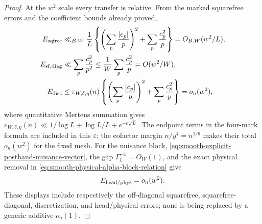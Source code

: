 \documentclass[11pt]{article}
\numberwithin{equation}{section}
\theoremstyle{definition}
\theoremstyle{remark}
\newcommand{\1}{\mathbf 1}
\begin{document}
\begin{proof}
At the \(w^2\) scale every transfer is relative.  From the marked
squarefree errors and the coefficient bounds already proved,
\begin{align}
 E_{\rm sqfree}
 &\ll_{B,W}\frac1L\left\{
       \left(\sum_p\frac{|c_p|}{p}\right)^2
       +\sum_p\frac{c_p^2}{p}\right\}
   =O_{B,W}(w^2/L),\notag\\
 E_{\rm sf,diag}
 &\ll\sum_p\frac{c_p^2}{p^2}
   \leq\frac1W\sum_p\frac{c_p^2}{p}
   =O(w^2/W),\notag\\
 E_{\rm disc}
 &\leq \varepsilon_{W,\delta,\eta}(n)
       \left\{\left(\sum_p\frac{|c_p|}{p}\right)^2
       +\sum_p\frac{c_p^2}{p}\right\}
   =o_n(w^2),
 \label{eq:smooth-relative-squarefree-errors}
\end{align}
where quantitative Mertens summation gives
\(\varepsilon_{W,\delta,\eta}(n)\ll
1/\log L+\log L/L+e^{-c\sqrt L}\).  The endpoint terms in the four-mark formula
are included in this \(\varepsilon\); the cofactor margin
\(n/y^4=n^{1/9}\) makes their total \(o_n(w^2)\) for the fixed mesh.
For the nuisance block,
\eqref{eq:smooth-explicit-postband-nuisance-vector}, the gap
\(\Gamma_\xi^{-1}=O_W(1)\), and the exact physical removal in
\eqref{eq:smooth-physical-alpha-block-relation} give
\begin{equation}
                         E_{\rm head/phys}=o_n(w^2).
 \label{eq:smooth-relative-head-physical-error}
\end{equation}
These displays include respectively the off-diagonal squarefree,
squarefree-diagonal, discretization, and head/physical errors; none is
being replaced by a generic additive \(o_n(1)\).


\end{proof}
\end{document}
